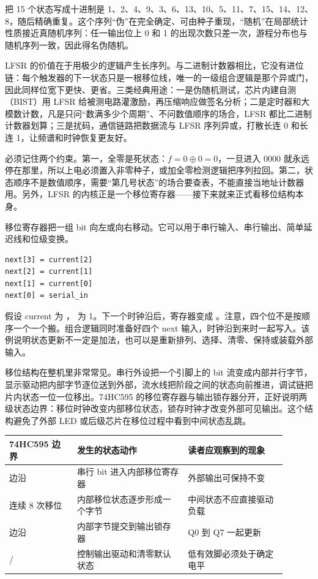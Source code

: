 把 15 个状态写成十进制是 1、2、4、9、3、6、13、10、5、11、7、15、14、12、8，随后精确重复。这个序列“伪”在完全确定、可由种子重现，“随机”在局部统计性质接近真随机序列：任一输出位上 0 和 1 的出现次数只差一次，游程分布也与随机序列一致，因此得名伪随机。

LFSR 的价值在于用极少的逻辑产生长序列。与二进制计数器相比，它没有进位链：每个触发器的下一状态只是一根移位线，唯一的一级组合逻辑是那个异或门，因此同样位宽下更快、更省。三类经典用途：一是伪随机测试，芯片内建自测（BIST）用 LFSR 给被测电路灌激励，再压缩响应做签名分析；二是定时器和大模数计数，凡是只问“数满多少个周期”、不问数值顺序的场合，LFSR 都比二进制计数器划算；三是扰码，通信链路把数据流与 LFSR 序列异或，打散长连 0 和长连 1，让频谱和时钟恢复更友好。

必须记住两个约束。第一，全零是死状态：$f=0\oplus0=0$，一旦进入 0000 就永远停在那里，所以上电必须置入非零种子，或加全零检测逻辑把序列拉回。第二，状态顺序不是数值顺序，需要“第几号状态”的场合要查表，不能直接当地址计数器用。另外，LFSR 的内核正是一个移位寄存器——接下来就来正式看移位结构本身。

移位寄存器把一组 bit 向左或向右移动。它可以用于串行输入、串行输出、简单延迟线和位级变换。

\begin{lstlisting}
next[3] = current[2]
next[2] = current[1]
next[1] = current[0]
next[0] = serial_in
\end{lstlisting}



假设 current 为 ， 为 1。下一个时钟沿后，寄存器变成 。注意，四个位不是按顺序一个一个搬。组合逻辑同时准备好四个 next 输入，时钟沿到来时一起写入。该例说明状态更新不一定是加法，也可以是重新排列、选择、清零、保持或装载外部输入。

移位结构在整机里非常常见。串行外设把一个引脚上的 bit 流变成内部并行字节，显示驱动把内部字节逐位送到外部，流水线把阶段之间的状态向前推进，调试链把片内状态一位一位移出。74HC595 的移位寄存器与输出锁存器分开，正好说明两级状态边界：移位时钟改变内部移位状态，锁存时钟才改变外部可见输出。这个结构避免了外部 LED 或后级芯片在移位过程中看到中间状态乱跳。

\begin{longtable}{L{0.22\linewidth}L{0.36\linewidth}L{0.32\linewidth}}
\toprule
74HC595 边界 & 发生的状态动作 & 读者应观察到的现象 \\
\midrule
{} 边沿 & 串行 bit 进入内部移位寄存器 & 外部输出可保持不变 \\
连续 8 次移位 & 内部移位状态逐步形成一个字节 & 中间状态不应直接驱动负载 \\
 边沿 & 内部字节提交到输出锁存器 & Q0 到 Q7 一起更新 \\
/ & 控制输出驱动和清零默认状态 & 低有效脚必须处于确定电平 \\
\bottomrule
\end{longtable}

